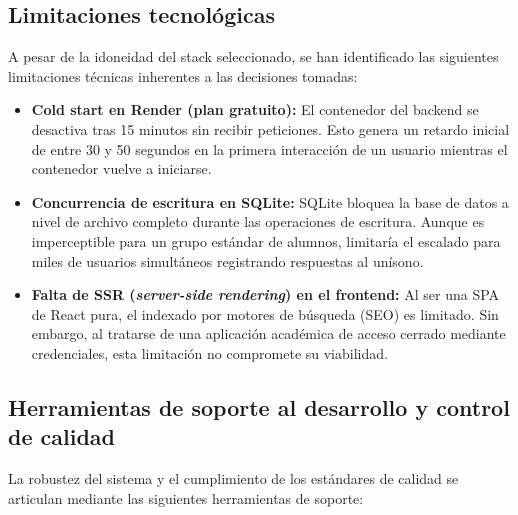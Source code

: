 \subsection{Limitaciones tecnológicas}\label{subsec:limitaciones_tecnologicas}

A pesar de la idoneidad del stack seleccionado, se han identificado las siguientes limitaciones técnicas inherentes a las decisiones tomadas:
\begin{itemize}
    \item \textbf{Cold start en Render (plan gratuito):} El contenedor del backend se desactiva tras 15 minutos sin recibir peticiones. Esto genera un retardo inicial de entre 30 y 50 segundos en la primera interacción de un usuario mientras el contenedor vuelve a iniciarse.
    \item \textbf{Concurrencia de escritura en SQLite:} SQLite bloquea la base de datos a nivel de archivo completo durante las operaciones de escritura. Aunque es imperceptible para un grupo estándar de alumnos, limitaría el escalado para miles de usuarios simultáneos registrando respuestas al unísono.
    \item \textbf{Falta de SSR (\textit{server-side rendering}) en el frontend:} Al ser una SPA de React pura, el indexado por motores de búsqueda (SEO) es limitado. Sin embargo, al tratarse de una aplicación académica de acceso cerrado mediante credenciales, esta limitación no compromete su viabilidad.
\end{itemize}

\subsection{Herramientas de soporte al desarrollo y control de calidad}\label{subsec:soporte_desarrollo}

La robustez del sistema y el cumplimiento de los estándares de calidad se articulan mediante las siguientes herramientas de soporte:

